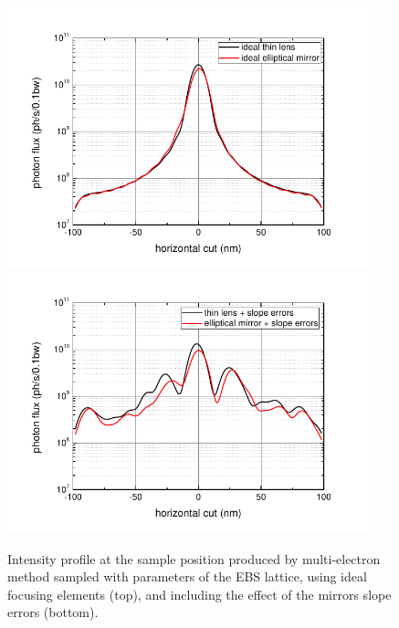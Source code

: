 \documentclass{iucr}              %
\begin{document}
\begin{figure}
    \centering
        \includegraphics[width=0.95\textwidth]{GRAPHICS/ebs_idealTE_idealOE_h.pdf}
        \includegraphics[width=0.95\textwidth]{GRAPHICS/ebs_slopeTE_slopeOE_h.pdf}
    \label{fig:FiniteEmittanceB}
    \caption{
    Intensity profile at the sample position produced by multi-electron method sampled with parameters of the EBS lattice, using ideal focusing elements (top), and including the effect of the mirrors slope errors (bottom).
    }
\end{figure}
\end{document}
